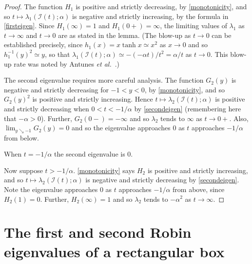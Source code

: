 \documentclass[12pt,reqno]{amsart}
\theoremstyle{definition}
\newcommand{\gt}{G_2}
\newcommand{\ho}{H_1}
\newcommand{\htwo}{H_2}
\begin{document}
\begin{proof}
The function $\ho$ is positive and strictly decreasing, by \autoref{monotonicity}, and so $t \mapsto \lambda_1(\mathcal{I}(t);\alpha)$ is negative and strictly increasing, by the formula in \autoref{firsteigen}. Since $\ho(\infty)=1$ and $\ho(0+)=\infty$, the limiting values of $\lambda_1$ as $t \to \infty$ and $t \to 0$ are as stated in the lemma. (The blow-up as $t \to 0$ can be established precisely, since $h_1(x) = x \tanh x \simeq x^2$ as $x \to 0$ and so $h_1^{-1}(y)^2 \simeq y$, so that $\lambda_1(\mathcal{I}(t);\alpha) \simeq -(-\alpha t) /t^2=\alpha/t$ as $t \to 0$. This blow-up rate was noted by Antunes \emph{et al.}\ \cite[Proposition 3]{AFK17}.)

The second eigenvalue requires more careful analysis. The function $\gt(y)$ is negative and strictly decreasing for $-1<y<0$, by \autoref{monotonicity}, and so $\gt(y)^2$ is positive and strictly increasing. Hence $t \mapsto \lambda_2(\mathcal{I}(t);\alpha)$ is positive and strictly decreasing when $0 < t < -1/\alpha$ by \autoref{secondeigen} (remembering here that $-\alpha>0$). Further, $\gt(0-)= -\infty$ and so $\lambda_2$ tends to $\infty$ as $t \to 0+$. Also, $\lim_{y \searrow -1} G_2(y)=0$ and so the eigenvalue approaches $0$ as $t$ approaches $-1/\alpha$ from below. 

When $t = -1/\alpha$ the second eigenvalue is $0$. 

Now suppose $t > -1/\alpha$. \autoref{monotonicity} says $\htwo$ is positive and strictly increasing, and so $t \mapsto \lambda_2(\mathcal{I}(t);\alpha)$ is negative and strictly decreasing by \autoref{secondeigen}. Note the eigenvalue approaches $0$ as $t$ approaches $-1/\alpha$ from above, since $\htwo(1)=0$. Further, $\htwo(\infty)=1$ and so $\lambda_2$ tends to $-\alpha^2$ as $t \to \infty$.
\end{proof}
%


\section{\bf The first and second Robin eigenvalues of a rectangular box}
\label{identifying}
\end{document}

